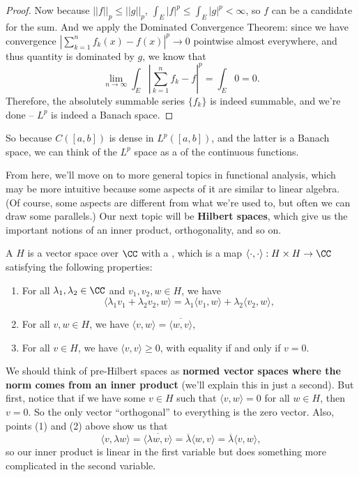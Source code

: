 \begin{proof}
Now because $||f||_p \le ||g||_p$, $\int_E |f|^p \le \int_E |g|^p < \infty$, so $f$ can be a candidate for the sum. And we apply the Dominated Convergence Theorem: since we have convergence $\left|\sum_{k=1}^n f_k(x) - f(x)\right|^p \to 0$ pointwise almost everywhere, and thus quantity is dominated by $g$, we know that 
\[
    \lim_{n \to \infty} \int_E \left|\sum_{k=1}^n f_k - f\right|^p = \int_E 0 = 0.
\]
Therefore, the absolutely summable series $\{f_k\}$ is indeed summable, and we're done -- $L^p$ is indeed a Banach space. 
\end{proof}

So because $C([a, b])$ is dense in $L^p([a, b])$, and the latter is a Banach space, we can think of the $L^p$ space as a  of the continuous functions.

From here, we'll move on to more general topics in functional analysis, which may be more intuitive because some aspects of it are similar to linear algebra. (Of course, some aspects are different from what we're used to, but often we can draw some parallels.) Our next topic will be \textbf{Hilbert spaces}, which give us the important notions of an inner product, orthogonality, and so on.

\begin{definition}
A  $H$ is a vector space over $\CC$ with a , which is a map $\langle \cdot, \cdot \rangle: H \times H \to \CC$ satisfying the following properties:
\begin{enumerate}
\item For all $\lambda_1, \lambda_2 \in \CC$ and $v_1, v_2, w \in H$, we have 
\[
    \langle \lambda_1 v_1 + \lambda_2 v_2, w \rangle = \lambda_1 \langle v_1, w \rangle + \lambda_2 \langle v_2, w \rangle,
\]
\item For all $v, w \in H$, we have $\langle v, w\rangle = \overline{\langle w, v \rangle}$,
\item For all $v \in H$, we have $\langle v, v \rangle \ge 0$, with equality if and only if $v = 0$.
\end{enumerate}
\end{definition}

We should think of pre-Hilbert spaces as \textbf{normed vector spaces where the norm comes from an inner product} (we'll explain this in just a second). But first, notice that if we have some $v \in H$ such that $\langle v, w \rangle = 0$ for all $w \in H$, then $v = 0$. So the only vector ``orthogonal'' to everything is the zero vector. Also, points (1) and (2) above show us that 
\[
    \langle v, \lambda w \rangle = \overline{\langle \lambda w, v \rangle} = \overline{\lambda} \langle w, v \rangle = \overline{\lambda} \langle v, w\rangle,
\]
so our inner product is linear in the first variable but does something more complicated in the second variable. 

